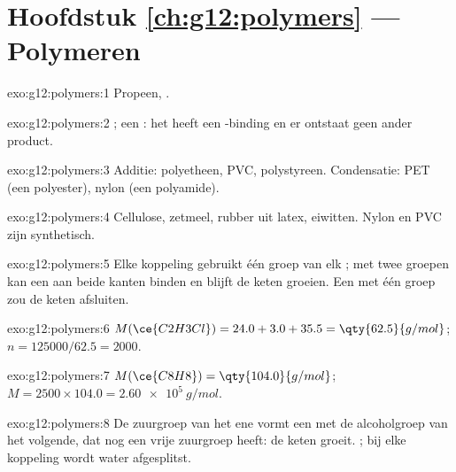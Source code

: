 \section*{Hoofdstuk \ref{ch:g12:polymers} --- Polymeren}

\begin{solution}{exo:g12:polymers:1}
Propeen, .
\end{solution}

\begin{solution}{exo:g12:polymers:2}
; een : het  heeft een
-binding en er ontstaat geen ander product.
\end{solution}

\begin{solution}{exo:g12:polymers:3}
Additie: polyetheen, PVC, polystyreen. Condensatie: PET (een polyester),
nylon (een polyamide).
\end{solution}

\begin{solution}{exo:g12:polymers:4}
Cellulose, zetmeel, rubber uit latex, eiwitten. Nylon en PVC zijn
synthetisch.
\end{solution}

\begin{solution}{exo:g12:polymers:5}
Elke koppeling gebruikt één groep van elk ; met twee groepen kan
een  aan beide kanten binden en blijft de keten groeien. Een
 met één groep zou de keten afsluiten.
\end{solution}

\begin{solution}{exo:g12:polymers:6}
$M(\ce{C2H3Cl}) = 24.0 + 3.0 + 35.5 = \qty{62.5}{g/mol}$;
$n = 125000/62.5 = 2000$.
\end{solution}

\begin{solution}{exo:g12:polymers:7}
$M(\ce{C8H8}) = \qty{104.0}{g/mol}$; $M = 2500 \times 104.0 =
\qty{2.60e5}{g/mol}$.
\end{solution}

\begin{solution}{exo:g12:polymers:8}
De zuurgroep van het ene  vormt een  met de alcoholgroep van
het volgende, dat nog een vrije zuurgroep heeft: de keten groeit.
 ; bij elke koppeling wordt water
afgesplitst.
\end{solution}

